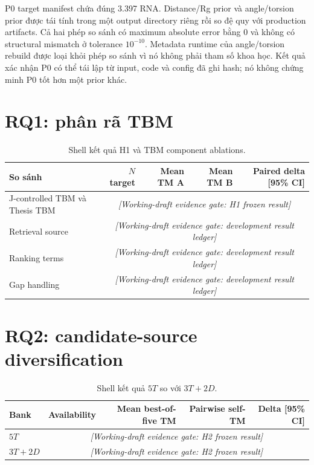 \documentclass[12pt,a4paper,oneside]{report}
\newcommand{\evidencepending}[1]{\textcolor{evidencegray}{\textit{[Working-draft evidence gate: #1]}}}
\begin{document}
P0 target manifest chứa đúng 3.397 RNA. Distance/Rg prior và angle/torsion prior được
tái tính trong một output directory riêng rồi so đệ quy với production artifacts.
Cả hai phép so sánh có maximum absolute error bằng 0 và không có structural mismatch
ở tolerance $10^{-10}$. Metadata runtime của angle/torsion rebuild được loại khỏi phép
so sánh vì nó không phải tham số khoa học. Kết quả xác nhận P0 có thể tái lập từ input,
code và config đã ghi hash; nó không chứng minh P0 tốt hơn một prior khác.

\section{RQ1: phân rã TBM}

\begin{table}[H]
\centering
\caption{Shell kết quả H1 và TBM component ablations.}
\begin{tabularx}{\textwidth}{Xrrrr}
\toprule
So sánh & $N$ target & Mean TM A & Mean TM B & Paired delta [95\% CI] \\
\midrule
J-controlled TBM và Thesis TBM & \multicolumn{4}{c}{\evidencepending{H1 frozen result}} \\
Retrieval source & \multicolumn{4}{c}{\evidencepending{development result ledger}} \\
Ranking terms & \multicolumn{4}{c}{\evidencepending{development result ledger}} \\
Gap handling & \multicolumn{4}{c}{\evidencepending{development result ledger}} \\
\bottomrule
\end{tabularx}
\end{table}

\section{RQ2: candidate-source diversification}

\begin{table}[H]
\centering
\caption{Shell kết quả $5T$ so với $3T+2D$.}
\begin{tabularx}{\textwidth}{Xrrrr}
\toprule
Bank & Availability & Mean best-of-five TM & Pairwise self-TM & Delta [95\% CI] \\
\midrule
$5T$ & \multicolumn{4}{c}{\evidencepending{H2 frozen result}} \\
$3T+2D$ & \multicolumn{4}{c}{\evidencepending{H2 frozen result}} \\
\bottomrule
\end{tabularx}
\end{table}
\end{document}
